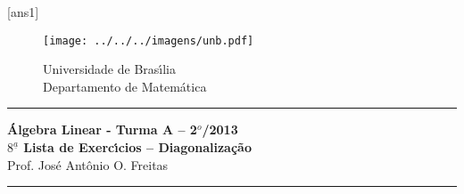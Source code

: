 \documentclass[12pt]{exam}
\newcommand{\vesp}[1]{\vspace{ #1  cm}}
\begin{document}
\pagestyle{empty}

[ans1]

\begin{figure}[h]
        \begin{minipage}[c]{1.7cm}
        \texttt{[image: ../../../imagens/unb.pdf]}
        \end{minipage}%
        \hspace{0pt}
        \begin{minipage}[c]{4in}
          {Universidade de Bras{\'\i}lia} \\
          {Departamento de Matem{\'a}tica}
\end{minipage}
\end{figure}

\vesp{-0.35} \hrule

\begin{center}
{\Large\bf \'Algebra Linear - Turma A -- 2$^{o}$/2013} \\ \vspace{9pt} {\large\bf
  $8^{\underline{a}}$ Lista de Exerc{\'\i}cios -- Diagonaliza\c{c}\~ao}\\ \vspace{9pt} Prof. Jos{\'e} Ant{\^o}nio O. Freitas
\end{center}
\hrule

\vesp{.6}
\end{document}
